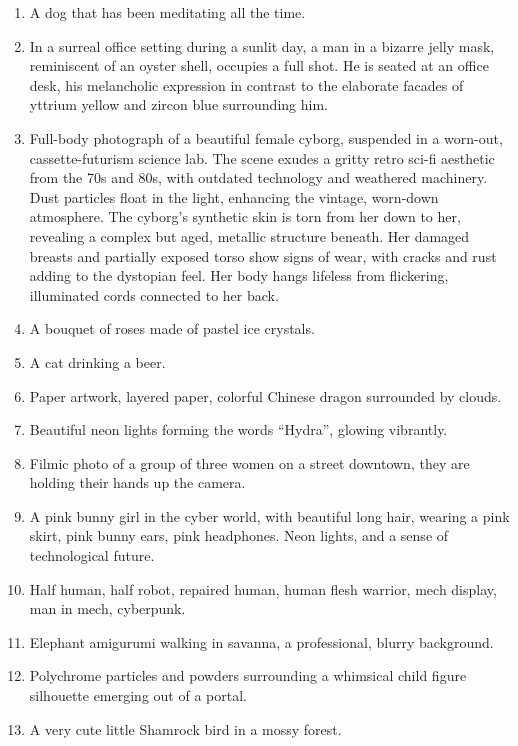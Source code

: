\begin{enumerate}
    \item A dog that has been meditating all the time.
    \item In a surreal office setting during a sunlit day, a man in a bizarre jelly mask, reminiscent of an oyster shell, occupies a full shot. He is seated at an office desk, his melancholic expression in contrast to the elaborate facades of yttrium yellow and zircon blue surrounding him.
    \item Full-body photograph of a beautiful female cyborg, suspended in a worn-out, cassette-futurism science lab. The scene exudes a gritty retro sci-fi aesthetic from the 70s and 80s, with outdated technology and weathered machinery. Dust particles float in the light, enhancing the vintage, worn-down atmosphere. The cyborg’s synthetic skin is torn from her down to her, revealing a complex but aged, metallic structure beneath. Her damaged breasts and partially exposed torso show signs of wear, with cracks and rust adding to the dystopian feel. Her body hangs lifeless from flickering, illuminated cords connected to her back.
    \item A bouquet of roses made of pastel ice crystals.
    \item A cat drinking a beer.
    \item Paper artwork, layered paper, colorful Chinese dragon surrounded by clouds.
    \item Beautiful neon lights forming the words ``Hydra'', glowing vibrantly.
    \item Filmic photo of a group of three women on a street downtown, they are holding their hands up the camera.
    \item A pink bunny girl in the cyber world, with beautiful long hair, wearing a pink skirt, pink bunny ears, pink headphones. Neon lights, and a sense of technological future.
    \item Half human, half robot, repaired human, human flesh warrior, mech display, man in mech, cyberpunk.
    \item Elephant amigurumi walking in savanna, a professional, blurry background.
    \item Polychrome particles and powders surrounding a whimsical child figure silhouette emerging out of a portal.
    \item A very cute little Shamrock bird in a mossy forest.
\end{enumerate}
